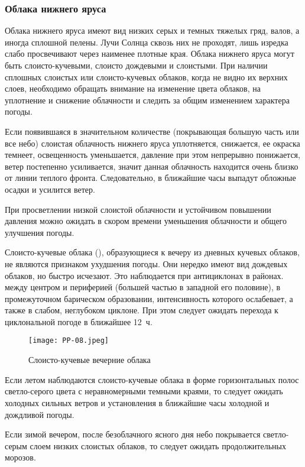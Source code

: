\subsubsection{Облака нижнего яруса}

Облака нижнего яруса имеют вид низких серых и темных тяжелых гряд,
валов, а иногда сплошной пелены. Лучи Солнца сквозь них не проходят,
лишь изредка слабо просвечивают через наименее плотные края. Облака
нижнего яруса могут быть слоисто-кучевыми, слоисто дождевыми и
слоистыми. При наличии сплошных слоистых или слоисто-кучевых облаков,
когда не видно их верхних слоев, необходимо обращать внимание на
изменение цвета облаков, на уплотнение и снижение облачности и следить
за общим изменением характера погоды.

 Если появившаяся в значительном количестве (покрывающая большую
часть или все небо) слоистая облачность нижнего яруса уплотняется,
снижается, ее окраска темнеет, освещенность уменьшается, давление при
этом непрерывно понижается, ветер постепенно усиливается, значит
данная облачность находится очень близко от линии теплого
фронта. Следовательно, в ближайшие часы выпадут обложные осадки и
усилится ветер.

 При просветлении низкой слоистой облачности и устойчивом
повышении давления можно ожидать в скором времени уменьшения
облачности и общего улучшения погоды.

 Слоисто-кучевые облака (), образующиеся к вечеру из
дневных кучевых облаков, не являются признаком ухудшения погоды. Они
нередко имеют вид дождевых облаков, но быстро исчезают. Это
наблюдается при антициклонах в районах. между центром и периферией
(большей частью в западной его половине), в промежуточном барическом
образовании, интенсивность которого ослабевает, а также в слабом,
неглубоком циклоне. При этом следует ожидать перехода к циклональной
погоде в ближайшее 12~ч.

\begin{figure}[htb]
  \centering{}
  \texttt{[image: PP-08.jpeg]}
  \caption{Слоисто-кучевые вечерние облака}
  \label{fig:pp08}
  \small
  \centering{}
\end{figure}

 Если летом наблюдаются слоисто-кучевые облака в форме
горизонтальных полос светло-серого цвета с неравномерными темными
краями, то следует ожидать холодных сильных ветров и установления в
ближайшие часы холодной и дождливой погоды.

 Если зимой вечером, после безоблачного ясного дня небо
покрывается светло-серым слоем низких слоистых облаков, то следует
ожидать продолжительных морозов.

